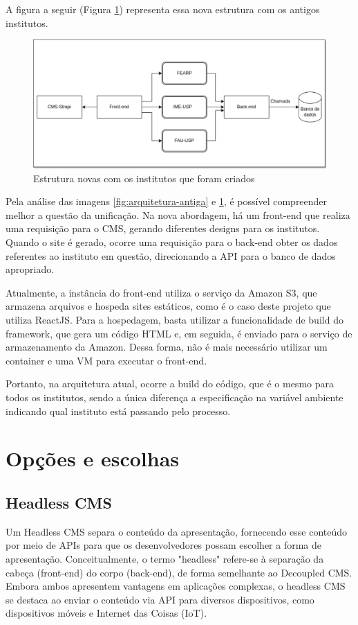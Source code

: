 A figura a seguir (Figura \ref{fig:arquitetura-nova}) representa essa nova estrutura com os antigos institutos.

\begin{figure}
    \centering
    \includegraphics[width=0.75\linewidth]{figuras/nova_arquitetura.drawio-_1_.pdf}
    \caption{Estrutura novas com os institutos que foram criados}
    \label{fig:arquitetura-nova}
\end{figure}

Pela análise das imagens \ref{fig:arquitetura-antiga} e \ref{fig:arquitetura-nova}, é possível compreender melhor a questão da unificação. Na nova abordagem, há um front-end que realiza uma requisição para o CMS, gerando diferentes designs para os institutos. Quando o site é gerado, ocorre uma requisição para o back-end obter os dados referentes ao instituto em questão, direcionando a API para o banco de dados apropriado.

Atualmente, a instância do front-end utiliza o serviço da Amazon S3, que armazena arquivos e hospeda sites estáticos, como é o caso deste projeto que utiliza ReactJS. Para a hospedagem, basta utilizar a funcionalidade de build do framework, que gera um código HTML e, em seguida, é enviado para o serviço de armazenamento da Amazon. Dessa forma, não é mais necessário utilizar um container e uma VM para executar o front-end.

Portanto, na arquitetura atual, ocorre a build do código, que é o mesmo para todos os institutos, sendo a única diferença a especificação na variável ambiente indicando qual instituto está passando pelo processo.

\section{Opções e escolhas}
    \subsection{Headless CMS}
Um Headless CMS separa o conteúdo da apresentação, fornecendo esse conteúdo por meio de APIs para que os desenvolvedores possam escolher a forma de apresentação. Conceitualmente, o termo "headless" refere-se à separação da cabeça (front-end) do corpo (back-end), de forma semelhante ao Decoupled CMS. Embora ambos apresentem vantagens em aplicações complexas, o headless CMS se destaca ao enviar o conteúdo via API para diversos dispositivos, como dispositivos móveis e Internet das Coisas (IoT).


